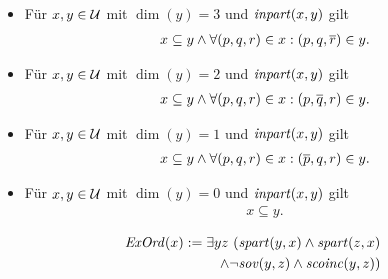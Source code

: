 \begin{hyp}\label{satz:inpart}
    \begin{itemize}\ 
        \item Für $x,y \in \mathcal{U}$ mit $\dim(y) = 3$ und $\mathit{inpart}(x,y)$ gilt
            \begin{align*}
                x \subseteq y \land \forall (p,q,r) \in x : (p,q,\overline{r}) \in y.
            \end{align*}
        \item Für $x,y \in \mathcal{U}$ mit $\dim(y) = 2$ und $\mathit{inpart}(x,y)$ gilt
            \begin{align*}
                x \subseteq y \land \forall (p,q,r) \in x : (p,\overline{q},r) \in y.
            \end{align*}
        \item Für $x,y \in \mathcal{U}$ mit $\dim(y) = 1$ und $\mathit{inpart}(x,y)$ gilt
            \begin{align*}
                x \subseteq y \land \forall (p,q,r) \in x : (\overline{p},q,r) \in y.
            \end{align*}
        \item Für $x,y \in \mathcal{U}$ mit $\dim(y) = 0$ und $\mathit{inpart}(x,y)$ gilt
            \begin{align*}
                x \subseteq y.
            \end{align*}
    \end{itemize}
\end{hyp}


\begin{erin}
    \begin{align*}
        \mathit{ExOrd}(x) := \exists yz\ (&\mathit{spart}(y,x) \wedge \mathit{spart}(z,x) \\
        \wedge \neg&\mathit{sov}(y,z) \wedge \mathit{scoinc}(y,z))
    \end{align*}
\end{erin}

